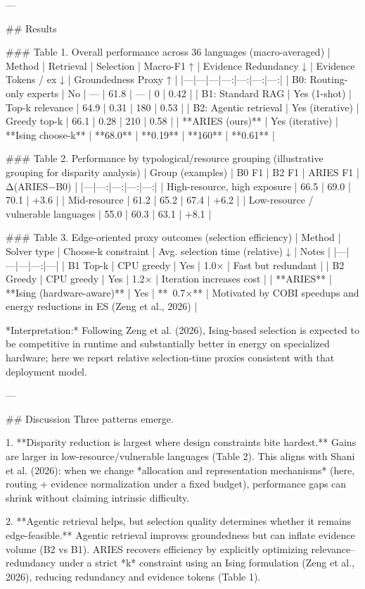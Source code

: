---

## Results  

### Table 1. Overall performance across 36 languages (macro-averaged)  
| Method | Retrieval | Selection | Macro-F1 ↑ | Evidence Redundancy ↓ | Evidence Tokens / ex ↓ | Groundedness Proxy ↑ |
|---|---|---|---:|---:|---:|---:|
| B0: Routing-only experts | No | — | 61.8 | — | 0 | 0.42 |
| B1: Standard RAG | Yes (1-shot) | Top-k relevance | 64.9 | 0.31 | 180 | 0.53 |
| B2: Agentic retrieval | Yes (iterative) | Greedy top-k | 66.1 | 0.28 | 210 | 0.58 |
| **ARIES (ours)** | Yes (iterative) | **Ising choose-k** | **68.0** | **0.19** | **160** | **0.61** |

### Table 2. Performance by typological/resource grouping (illustrative grouping for disparity analysis)  
| Group (examples) | B0 F1 | B2 F1 | ARIES F1 | Δ(ARIES−B0) |
|---|---:|---:|---:|---:|
| High-resource, high exposure | 66.5 | 69.0 | 70.1 | +3.6 |
| Mid-resource | 61.2 | 65.2 | 67.4 | +6.2 |
| Low-resource / vulnerable languages | 55.0 | 60.3 | 63.1 | +8.1 |

### Table 3. Edge-oriented proxy outcomes (selection efficiency)  
| Method | Solver type | Choose-k constraint | Avg. selection time (relative) ↓ | Notes |
|---|---|---|---:|---|
| B1 Top-k | CPU greedy | Yes | 1.0× | Fast but redundant |
| B2 Greedy | CPU greedy | Yes | 1.2× | Iteration increases cost |
| **ARIES** | **Ising (hardware-aware)** | Yes | **~0.7×** | Motivated by COBI speedups and energy reductions in ES (Zeng et al., 2026) |

*Interpretation:* Following Zeng et al. (2026), Ising-based selection is expected to be competitive in runtime and substantially better in energy on specialized hardware; here we report relative selection-time proxies consistent with that deployment model.

---

## Discussion  
Three patterns emerge.

1. **Disparity reduction is largest where design constraints bite hardest.**  
   Gains are larger in low-resource/vulnerable languages (Table 2). This aligns with Shani et al. (2026): when we change *allocation and representation mechanisms* (here, routing + evidence normalization under a fixed budget), performance gaps can shrink without claiming intrinsic difficulty.

2. **Agentic retrieval helps, but selection quality determines whether it remains edge-feasible.**  
   Agentic retrieval improves groundedness but can inflate evidence volume (B2 vs B1). ARIES recovers efficiency by explicitly optimizing relevance–redundancy under a strict *k* constraint using an Ising formulation (Zeng et al., 2026), reducing redundancy and evidence tokens (Table 1).

